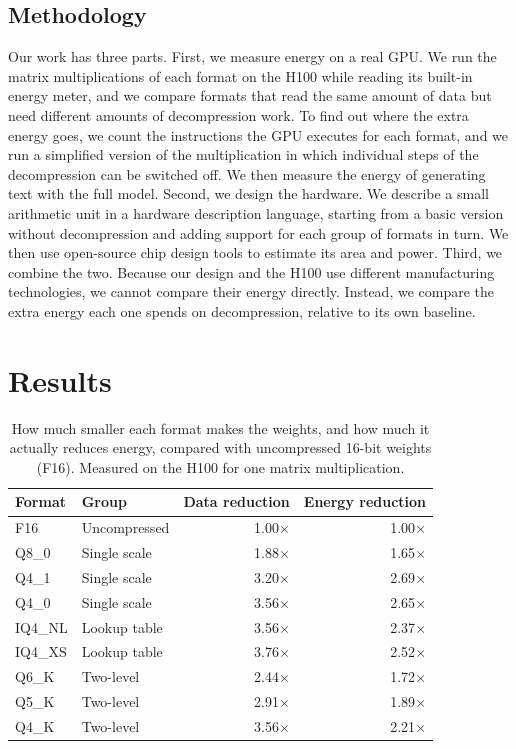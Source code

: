 \documentclass[10pt,twocolumn,letterpaper]{article}
\begin{document}
\subsection{Methodology}
Our work has three parts. First, we measure energy on a real GPU. We run the matrix multiplications of each format
on the H100 while reading its built-in energy meter, and we compare formats that read the same amount of data but
need different amounts of decompression work. To find out where the extra energy goes, we count the instructions
the GPU executes for each format, and we run a simplified version of the multiplication in which individual steps
of the decompression can be switched off. We then measure the energy of generating text with the full model.
Second, we design the hardware. We describe a small arithmetic unit in a hardware description language, starting
from a basic version without decompression and adding support for each group of formats in turn. We then use open-source chip
design tools to estimate its area and power. Third, we combine the two. Because our design and the H100 use
different manufacturing technologies, we cannot compare their energy directly. Instead, we compare the extra energy
each one spends on decompression, relative to its own baseline.

\section{Results}
\label{sec:results}

\begin{table}[t]
\centering\small
\caption{How much smaller each format makes the weights, and how much it actually reduces energy, compared with
uncompressed 16-bit weights (F16). Measured on the H100 for one matrix multiplication.}
\label{tab:energy}
\begin{tabular}{@{}llrr@{}}
\toprule
Format & Group & Data reduction & Energy reduction\\
\midrule
F16 & Uncompressed & 1.00$\times$ & 1.00$\times$\\
Q8\_0 & Single scale & 1.88$\times$ & 1.65$\times$\\
Q4\_1 & Single scale & 3.20$\times$ & 2.69$\times$\\
Q4\_0 & Single scale & 3.56$\times$ & 2.65$\times$\\
IQ4\_NL & Lookup table & 3.56$\times$ & 2.37$\times$\\
IQ4\_XS & Lookup table & 3.76$\times$ & 2.52$\times$\\
Q6\_K & Two-level & 2.44$\times$ & 1.72$\times$\\
Q5\_K & Two-level & 2.91$\times$ & 1.89$\times$\\
Q4\_K & Two-level & 3.56$\times$ & 2.21$\times$\\
\bottomrule
\end{tabular}
\end{table}
\end{document}
